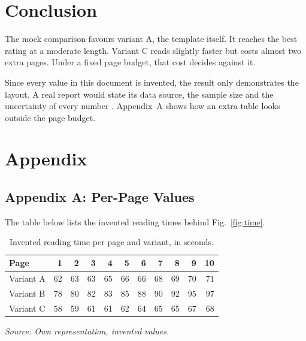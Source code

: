 \documentclass[11pt,a4paper]{article}
\newcommand{\srcnote}[2][\linewidth]{%
  {\setlength{\parskip}{0pt}\par\nobreak\vspace{6pt}%
   \noindent\parbox{#1}{\raggedright\itshape\fontsize{10}{12}\selectfont Source: #2}\par}}
\renewcommand{\arraystretch}{1.1}
\newcommand{\tablefontsize}{\fontsize{9}{10.5}\selectfont
  \renewcommand{\arraystretch}{1.0}\setlength{\tabcolsep}{6pt}}
\begin{document}
\section{Conclusion}

The mock comparison favours variant A, the template itself. It reaches the
best rating at a moderate length. Variant C reads slightly faster but costs
almost two extra pages. Under a fixed page budget, that cost decides against
it.

Since every value in this document is invented, the result only demonstrates
the layout. A real report would state its data source, the sample size and
the uncertainty of every number \parencite{strunk2000}. Appendix~A shows how
an extra table looks outside the page budget.

\newpage
\printbibliography[heading=bibintoc,title={References}]

\newpage
\section*{Appendix}

\subsection*{Appendix A: Per-Page Values}\label{app:a}

The table below lists the invented reading times behind Fig.~\ref{fig:time}.

\begin{table}[H]
  \centering
  \caption{Invented reading time per page and variant, in seconds.}
  \label{tab:appendix}
  {\tablefontsize
  \begin{tabular}{@{}lrrrrrrrrrr@{}}
    \toprule
    Page & 1 & 2 & 3 & 4 & 5 & 6 & 7 & 8 & 9 & 10 \\
    \midrule
    Variant A & 62 & 63 & 63 & 65 & 66 & 66 & 68 & 69 & 70 & 71 \\
    Variant B & 78 & 80 & 82 & 83 & 85 & 88 & 90 & 92 & 95 & 97 \\
    Variant C & 58 & 59 & 61 & 61 & 62 & 64 & 65 & 65 & 67 & 68 \\
    \bottomrule
  \end{tabular}}
  \srcnote{Own representation, invented values.}
\end{table}
\end{document}
